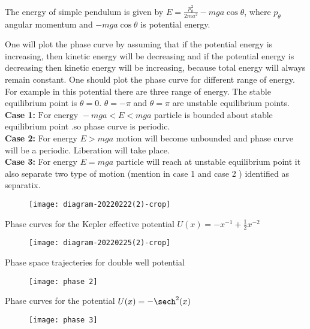 \begin{example}
 The energy of simple pendulum is given by $E=\frac{p_{\theta}^{2}}{2 m a^{2}}-m g a \cos \theta$, where $p_{\theta}$ angular momentum and $-m g a \cos \theta$ is potential energy.
\end{example}
\begin{answer}
	One will plot the phase curve by assuming that if the potential energy is increasing, then kinetic energy will be decreasing and if the potential energy is decreasing then kinetic energy will be increasing, because total energy will always remain constant. One should plot the phase curve for different range of energy. For example in this potential there are three range of energy.
	The stable equilibrium point is $\theta=0$. $\theta=-\pi$ and $\theta=\pi$ are unstable equilibrium points.\\
	\textbf{Case 1:}$\text { For energy }-m g a<E<m g a$  particle is bounded about stable equilibrium point .so phase curve is periodic.\\
	\textbf{Case 2:} For energy $E>m g a$ motion will become unbounded and phase curve will be a periodic. Liberation will take place.\\
	\textbf{Case 3:} For energy $E=m g a$ particle will reach at unstable equilibrium point it also separate two type of motion (mention in case 1 and case 2 ) identified as separatix.
	\begin{figure}[H]
		\centering
		\texttt{[image: diagram-20220222(2)-crop]}
	\end{figure}
\end{answer}
\begin{example}
	Phase curves for the Kepler effective potential $U(x)=-x^{-1}+\frac{1}{2}x^{-2}$
\end{example}
\begin{answer}
	\begin{figure}[H]
		\centering
		\texttt{[image: diagram-20220225(2)-crop]}
	\end{figure}
\end{answer}
\begin{example}
	Phase space trajecteries for double well potential
\end{example}
\begin{answer}
\begin{figure}[H]
	\centering
	\texttt{[image: phase 2]}
\end{figure}	
\end{answer}
\begin{example}
	Phase curves for the potential $U(x)=-\sech^2(x)$
\end{example}
\begin{answer}
\begin{figure}[H]
	\centering
	\texttt{[image: phase 3]}
\end{figure}	
\end{answer}











